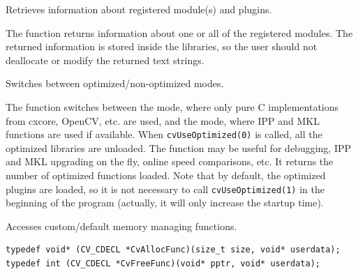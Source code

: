 Retrieves information about registered module(s) and plugins.


\begin{description}
\end{description}

The function returns information about one or
all of the registered modules. The returned information is stored inside
the libraries, so the user should not deallocate or modify the returned
text strings.

Switches between optimized/non-optimized modes.


\begin{description}
\end{description}

The function switches between the mode, where
only pure C implementations from cxcore, OpenCV, etc. are used, and
the mode, where IPP and MKL functions are used if available. When
\texttt{cvUseOptimized(0)} is called, all the optimized libraries are
unloaded. The function may be useful for debugging, IPP and MKL upgrading on
the fly, online speed comparisons, etc. It returns the number of optimized
functions loaded. Note that by default, the optimized plugins are loaded,
so it is not necessary to call \texttt{cvUseOptimized(1)} in the beginning of
the program (actually, it will only increase the startup time).

Accesses custom/default memory managing functions.

\begin{lstlisting}
typedef void* (CV_CDECL *CvAllocFunc)(size_t size, void* userdata);
typedef int (CV_CDECL *CvFreeFunc)(void* pptr, void* userdata);
\end{lstlisting}

